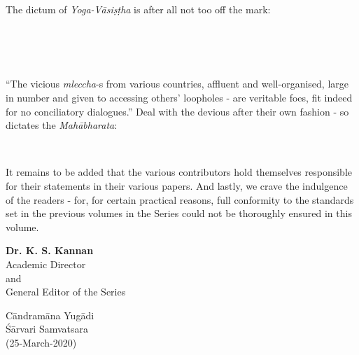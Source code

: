 The dictum of \textit{Yoga-Vāsiṣṭha} is after all not too off the mark:
\begin{center}
 \\\\ \\
\end{center}

“The vicious \textit{mleccha}-s from various countries, affluent and well-organised, large in number and given to accessing others’ loopholes - are veritable foes, fit indeed for no conciliatory dialogues.” Deal with the devious after their own fashion - so dictates the \textit{Mahābharata}:
\begin{center}
\\
\end{center}

It remains to be added that the various contributors hold themselves responsible for their statements in their various papers. And lastly, we crave the indulgence of the readers - for, for certain practical reasons, full conformity to the standards set in the previous volumes in the Series could not be thoroughly ensured in this volume.

\begin{flushright}
\textbf{Dr. K. S. Kannan}\\
Academic Director\\
and\\
General Editor of the Series\\
\end{flushright}

\begin{flushleft}
Cāndramāna Yugādi\\
Śārvari Samvatsara\\
(25-March-2020)
\end{flushleft}
